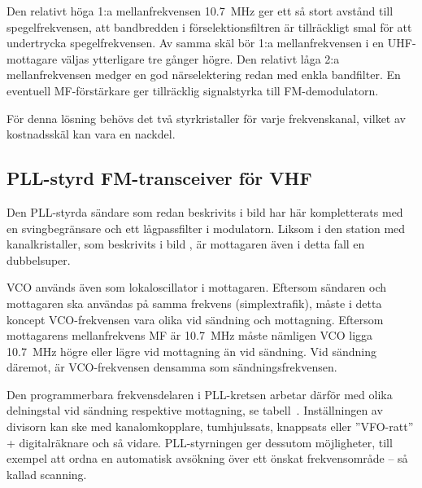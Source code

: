 Den relativt höga 1:a mellanfrekvensen \qty{10,7}{\mega\hertz} ger ett så stort
avstånd till spegelfrekvensen, att bandbredden i förselektionsfiltren
är tillräckligt smal för att undertrycka spegelfrekvensen.
Av samma skäl bör 1:a mellanfrekvensen i en UHF-mottagare väljas ytterligare
tre gånger högre.
Den relativt låga 2:a mellanfrekvensen medger en god närselektering
redan med enkla bandfilter.
En eventuell MF-förstärkare ger tillräcklig signalstyrka till FM-demodulatorn.

För denna lösning behövs det två styrkristaller för varje
frekvenskanal, vilket av kostnadsskäl kan vara en nackdel.

\subsection{PLL-styrd FM-transceiver för VHF}


Den PLL-styrda sändare som redan beskrivits i bild  har här
kompletterats med en svingbegränsare och ett lågpassfilter i modulatorn.
Liksom i den station med kanalkristaller, som beskrivits i
bild , är mottagaren även i detta fall en dubbelsuper.

VCO används även som lokaloscillator i mottagaren.
Eftersom sändaren och mottagaren ska användas på samma frekvens
(simplextrafik), måste i detta koncept VCO-frekvensen vara olika vid
sändning och mottagning.
Eftersom mottagarens mellanfrekvens MF är \qty{10,7}{\mega\hertz} måste nämligen
VCO ligga \qty{10,7}{\mega\hertz} högre eller lägre vid mottagning än vid
sändning.
Vid sändning däremot, är VCO-frekvensen densamma som sändningsfrekvensen.

Den programmerbara frekvensdelaren i PLL-kret\-sen arbetar därför med
olika delningstal vid sändning respektive mottagning, se tabell~.
Inställningen av divisorn kan ske med kanalomkopplare, tumhjulssats,
knappsats eller ''VFO-ratt'' + digitalräknare och så vidare.
PLL-styrningen ger dessutom möjligheter, till exempel att ordna en automatisk
avsökning över ett önskat frekvensområde -- så kallad scanning.

